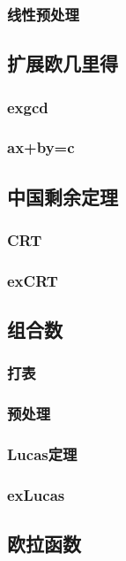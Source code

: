 ﻿\documentclass[a4paper,twocolumn]{article}
\begin{document}
\subsubsection{线性预处理}

\subsection{扩展欧几里得}
\subsubsection{exgcd}

\subsubsection{ax+by=c}

\subsection{中国剩余定理}
\subsubsection{CRT}

\subsubsection{exCRT}

\subsection{组合数}
\subsubsection{打表}

\subsubsection{预处理}

\subsubsection{Lucas定理}

\subsubsection{exLucas}

\subsection{欧拉函数}
\begin{spacing}{1.5}

\end{spacing}
\end{document}
